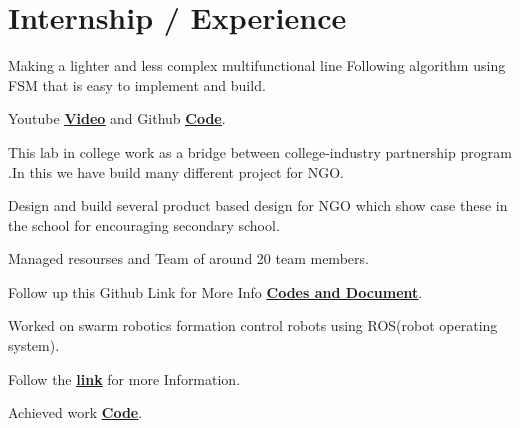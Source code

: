 \documentclass[]{font}
\begin{document}
\begin{minipage}[t]{0.64\textwidth} 


\section{Internship / Experience}

\vspace{\topsep} %
\begin{tightemize}
\item Making a lighter and less complex multifunctional line Following algorithm
using​ ​ FSM​ that is easy to implement and build.
\item Youtube \textbf{\href{https://youtu.be/FhUvQlrLWxc}{\underline{Video}}} and Github \textbf{\href{https://github.com/pranav083/FSM_code}{\underline{Code}}}. 
\end{tightemize}
\sectionsep

\begin{tightemize}
\item This lab in college work as a bridge between college-industry partnership program .In this we have build many different project for NGO.
\item Design and build several product based design for NGO which show
case these in the school for encouraging secondary school.
\item Managed resourses and Team of around 20 team members. 
\item Follow up this Github Link for More Info \textbf{\href{https://github.com/pranav083/Tinkering_project}{\underline{Codes and Document}}}.	
\end{tightemize}
\sectionsep

\begin{tightemize}
\item Worked on swarm robotics formation control robots using ROS(robot operating system).
\item Follow the \textbf{\href{http://crip.ml}{\underline{link}}} for more  Information.
\item Achieved work \textbf{\href{https://github.com/pranav083/ROS_work_earlier_nrf}{\underline{Code}}}.	
\end{tightemize}
\sectionsep


\end{minipage}
\end{document}

